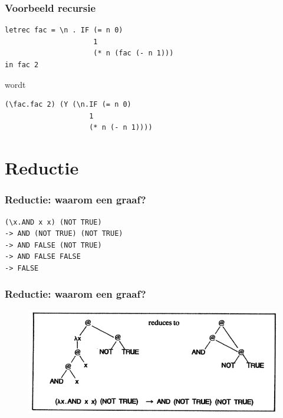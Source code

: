 \documentclass{beamer}
\begin{document}
\begin{frame}[fragile]
  \frametitle{Voorbeeld recursie}
  \begin{lstlisting}
letrec fac = \n . IF (= n 0)
                     1
                     (* n (fac (- n 1)))
in fac 2
  \end{lstlisting}
wordt
  \begin{lstlisting}
(\fac.fac 2) (Y (\n.IF (= n 0)
                    1
                    (* n (- n 1))))
  \end{lstlisting}
\end{frame}


\section{Reductie}

\begin{frame}[fragile]
  \frametitle{Reductie: waarom een graaf?}
  \begin{lstlisting}
(\x.AND x x) (NOT TRUE)
-> AND (NOT TRUE) (NOT TRUE)
-> AND FALSE (NOT TRUE)
-> AND FALSE FALSE
-> FALSE
  \end{lstlisting}
\end{frame}

\begin{frame}
  \frametitle{Reductie: waarom een graaf?}
  \begin{figure}
    \includegraphics[width=\linewidth]{images/slpj208}
  \end{figure}
\end{frame}
\end{document}
